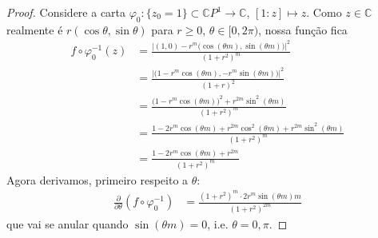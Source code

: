 \begin{proof}\leavevmode
Considere a carta \(\varphi_0:\{z_0=1\}\subset\mathbb{C}P^{1}\to \mathbb{C}\), \([1:z]\mapsto z\). Como \(z \in \mathbb{C}\) realmente é \(r(\cos \theta, \sin  \theta)\) para \(r\geq 0\), \(\theta \in [0, 2\pi)\), nossa função fica
\begin{align*}
f\circ \varphi_0^{-1}(z)&=\frac{ \Big|(1,0)-r^m\Big(\cos (\theta m), \sin (\theta m)\Big)\Big|^2}{(1+r^2)^m}\\
&=\frac{\Big|\Big(1-r^m\cos (\theta m),-r^m \sin (\theta m)\Big)\Big|^2}{(1+r)^2}\\
&=\frac{\Big(1-r^m \cos (\theta m) \Big)^2+ r^{2m} \sin^2(\theta m)}{(1+r^2)^m}\\
&=\frac{1-2 r^m \cos (\theta m)+r^{2m} \cos^2(\theta m)+r^{2m} \sin^2 (\theta m)}{(1+r^2)^m}\\
&=\frac{1-2r^m \cos (\theta m)+r^{2m}}{(1+r^2)^m}
\end{align*}
Agora derivamos, primeiro respeito a \(\theta\):
\begin{align*}
\frac{\partial }{\partial \theta}(f \circ \varphi_0^{-1})&= \frac{(1+r^2)^m\cdot  2r^m \sin(\theta m)m}{(1+r^2)^{2m}}
\end{align*}
que vai se anular quando \(\sin  (\theta m)=0\), i.e. \(\theta =0,\pi\).


\end{proof}
